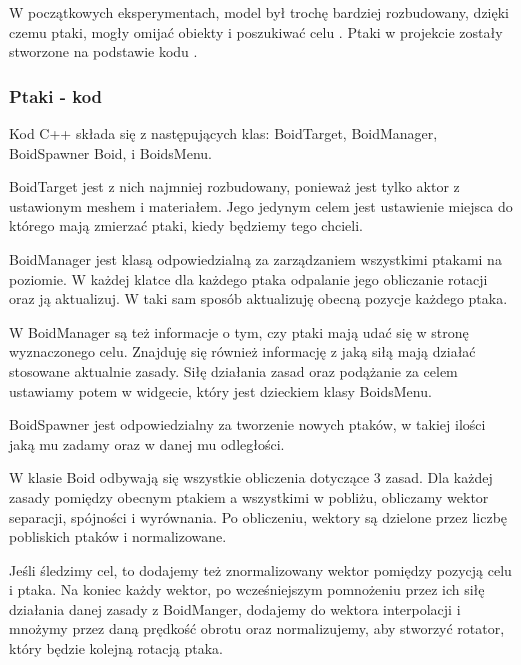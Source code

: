 \documentclass[a4paper,12pt,reqno]{article}
\begin{document}
W początkowych eksperymentach, model był trochę bardziej rozbudowany, dzięki czemu ptaki, mogły omijać obiekty i poszukiwać celu \cite{boids_reynolds}. Ptaki w projekcie zostały stworzone na podstawie kodu \cite{code_boids}.

\subsubsection{Ptaki - kod}

Kod C++ składa się z następujących klas: BoidTarget, BoidManager, BoidSpawner Boid,  i BoidsMenu. 

BoidTarget jest z nich najmniej rozbudowany, ponieważ jest tylko aktor z ustawionym meshem i materiałem. Jego jedynym celem jest ustawienie miejsca do którego mają zmierzać ptaki, kiedy będziemy tego chcieli.

BoidManager jest klasą odpowiedzialną za zarządzaniem wszystkimi ptakami na poziomie. W każdej klatce dla każdego ptaka odpalanie jego obliczanie rotacji oraz ją aktualizuj. W taki sam sposób aktualizuję obecną pozycje każdego ptaka.



W BoidManager są też informacje o tym, czy ptaki mają udać się w stronę wyznaczonego celu. Znajduję się również informację z jaką siłą mają działać stosowane aktualnie zasady. Siłę działania zasad oraz podążanie za celem ustawiamy potem w widgecie, który jest dzieckiem klasy BoidsMenu.

BoidSpawner jest odpowiedzialny za tworzenie nowych ptaków, w takiej ilości jaką mu zadamy oraz w danej mu odległości.

W klasie Boid odbywają się wszystkie obliczenia dotyczące 3 zasad. Dla każdej zasady pomiędzy obecnym ptakiem a wszystkimi w pobliżu, obliczamy wektor separacji, spójności i wyrównania. Po obliczeniu, wektory są dzielone przez liczbę pobliskich ptaków i normalizowane.



Jeśli śledzimy cel, to dodajemy też znormalizowany wektor pomiędzy pozycją celu i ptaka. Na koniec każdy wektor, po wcześniejszym pomnożeniu przez ich siłę działania danej zasady z BoidManger, dodajemy do wektora interpolacji i mnożymy przez daną prędkość obrotu oraz normalizujemy, aby stworzyć rotator, który będzie kolejną rotacją ptaka.
\end{document}
